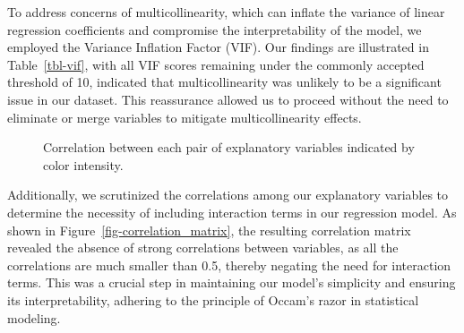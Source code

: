 \documentclass[
  letterpaper,
  DIV=11,
  numbers=noendperiod]{scrartcl}
\begin{document}
To address concerns of multicollinearity, which can inflate the variance
of linear regression coefficients and compromise the interpretability of
the model, we employed the Variance Inflation Factor (VIF). Our findings
are illustrated in Table~\ref{tbl-vif}, with all VIF scores remaining
under the commonly accepted threshold of 10, indicated that
multicollinearity was unlikely to be a significant issue in our dataset.
This reassurance allowed us to proceed without the need to eliminate or
merge variables to mitigate multicollinearity effects.

\begin{figure}


\caption{\label{fig-correlation\_matrix}Correlation between each pair of
explanatory variables indicated by color intensity.}

\end{figure}%

Additionally, we scrutinized the correlations among our explanatory
variables to determine the necessity of including interaction terms in
our regression model. As shown in Figure~\ref{fig-correlation_matrix},
the resulting correlation matrix revealed the absence of strong
correlations between variables, as all the correlations are much smaller
than 0.5, thereby negating the need for interaction terms. This was a
crucial step in maintaining our model's simplicity and ensuring its
interpretability, adhering to the principle of Occam's razor in
statistical modeling.
\end{document}
